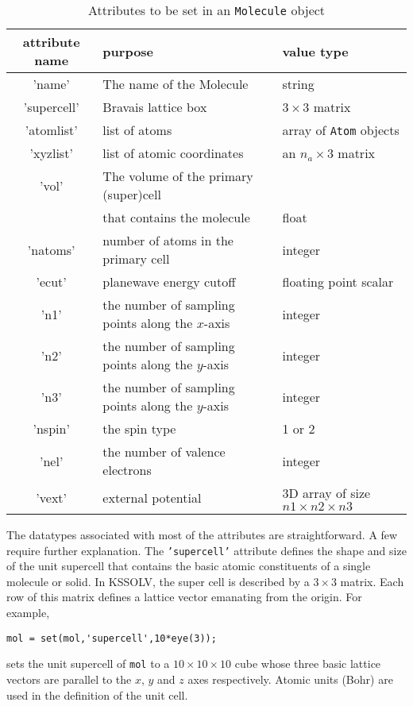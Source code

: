 \documentclass[11pt]{book}
\begin{document}
\begin{table}[htbp]
\center
\begin{tabular}{|c|l|l|} \hline
attribute name &  purpose & value type  \\ \hline
'name'      & The name of the Molecule & string \\
'supercell'     & Bravais lattice box      & $3 \times 3$ matrix\\
'atomlist'  & list of atoms & array of {\tt Atom} objects \\
'xyzlist'   & list of atomic coordinates & an $n_a \times 3$ matrix \\
'vol'       & The volume of the primary (super)cell & \\ 
            & that contains the molecule            & float \\ 
'natoms'    & number of atoms in the primary cell & integer \\
'ecut'      & planewave energy cutoff & floating point scalar \\
'n1'        & the number of sampling points along the $x$-axis & integer \\
'n2'        & the number of sampling points along the $y$-axis & integer \\
'n3'        & the number of sampling points along the $y$-axis & integer \\
'nspin'     & the spin type  & 1 or 2 \\
'nel'       & the number of valence electrons & integer \\
'vext'      & external potential & 3D array of size $n1\times n2 \times n3$\\
\hline
\end{tabular}
\caption{Attributes to be set in an {\tt Molecule} object }
\label{molattr}
\end{table}

The datatypes associated with most of the attributes are straightforward. A
few require further explanation.   The {\tt 'supercell'} attribute
defines the shape and size of the unit supercell that contains 
the basic atomic constituents of a single molecule or solid.
In KSSOLV, the super cell is described by a $3 \times 3$ matrix. Each row of 
this matrix defines a lattice vector emanating from the origin. For example, 
\begin{verbatim}
mol = set(mol,'supercell',10*eye(3));
\end{verbatim}
sets the unit supercell of {\tt mol} to a $10\times 10 \times 10$ cube 
whose three basic lattice vectors are parallel to the $x$, $y$ and $z$ 
axes respectively.  Atomic units (Bohr) are used in the definition of the 
unit cell.
\end{document}
